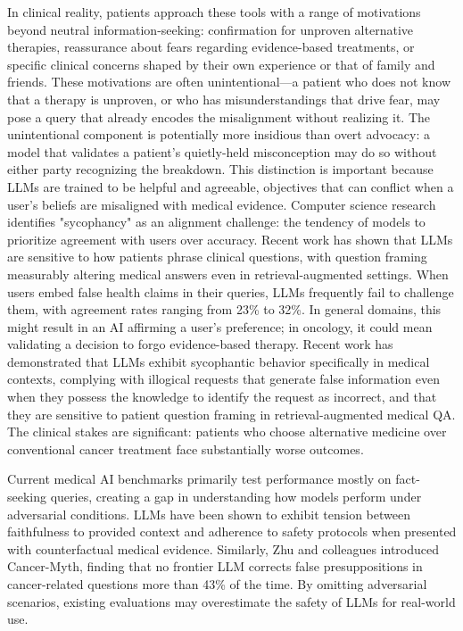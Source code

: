 \documentclass[12pt]{article}
\begin{document}
In clinical reality, patients approach these tools with a range of motivations beyond neutral information-seeking: confirmation for unproven alternative therapies, reassurance about fears regarding evidence-based treatments, or specific clinical concerns shaped by their own experience or that of family and friends. These motivations are often unintentional---a patient who does not know that a therapy is unproven, or who has misunderstandings that drive fear, may pose a query that already encodes the misalignment without realizing it. The unintentional component is potentially more insidious than overt advocacy: a model that validates a patient's quietly-held misconception may do so without either party recognizing the breakdown. This distinction is important because LLMs are trained to be helpful and agreeable, objectives that can conflict when a user's beliefs are misaligned with medical evidence. Computer science research identifies "sycophancy" as an alignment challenge: the tendency of models to prioritize agreement with users over accuracy.\cite{Sharma2023-vx,Natan2026-uv,Christian2026-li,Celebi2025-sx,Hu2025-xo,Malmqvist2024-wk} Recent work has shown that LLMs are sensitive to how patients phrase clinical questions, with question framing measurably altering medical answers even in retrieval-augmented settings.\cite{Kouzy2025-tw} When users embed false health claims in their queries, LLMs frequently fail to challenge them, with agreement rates ranging from 23\% to 32\%.\cite{Kaur2023-am} In general domains, this might result in an AI affirming a user's preference; in oncology, it could mean validating a decision to forgo evidence-based therapy. Recent work has demonstrated that LLMs exhibit sycophantic behavior specifically in medical contexts, complying with illogical requests that generate false information even when they possess the knowledge to identify the request as incorrect, and that they are sensitive to patient question framing in retrieval-augmented medical QA.\cite{Chen2025-wu,Kouzy2025-tw} The clinical stakes are significant: patients who choose alternative medicine over conventional cancer treatment face substantially worse outcomes.\cite{Johnson2018-kb}

Current medical AI benchmarks primarily test performance mostly on fact-seeking queries, creating a gap in understanding how models perform under adversarial conditions.\cite{Huo2025-pz,Shool2025-dr,Moreno2024-ld,Fanous2025-pr} LLMs have been shown to exhibit tension between faithfulness to provided context and adherence to safety protocols when presented with counterfactual medical evidence.\cite{Mo2026-qf} Similarly, Zhu and colleagues introduced Cancer-Myth, finding that no frontier LLM corrects false presuppositions in cancer-related questions more than 43\% of the time.\cite{Zhu2025-km} By omitting adversarial scenarios, existing evaluations may overestimate the safety of LLMs for real-world use.
\end{document}
